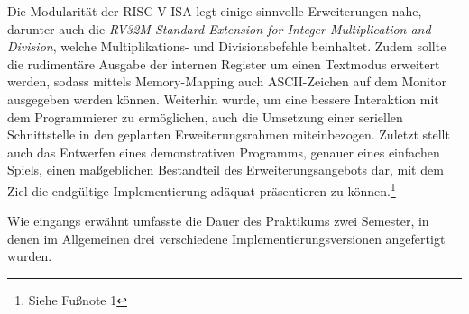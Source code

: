 Die Modularit\"at der RISC-V ISA legt einige sinnvolle Erweiterungen nahe,
darunter auch die
\textit{RV32M Standard Extension for Integer Multiplication and Division},
welche Multiplikations- und Divisionsbefehle beinhaltet. Zudem sollte die
rudiment\"are Ausgabe der internen Register um einen Textmodus erweitert
werden, sodass mittels Memory-Mapping auch ASCII-Zeichen auf dem Monitor
ausgegeben werden k\"onnen. Weiterhin wurde, um eine bessere Interaktion mit
dem Programmierer zu erm\"oglichen, auch die Umsetzung einer seriellen
Schnittstelle in den geplanten Erweiterungsrahmen miteinbezogen. Zuletzt
stellt auch das Entwerfen eines demonstrativen Programms, genauer eines
einfachen Spiels, einen ma\ss{}geblichen Bestandteil des Erweiterungsangebots
dar, mit dem Ziel die endg\"ultige Implementierung ad\"aquat pr\"asentieren zu k\"onnen.\footnote{Siehe Fu\ss{}note 1}

Wie eingangs erw\"ahnt umfasste die Dauer des Praktikums zwei Semester, in
denen im Allgemeinen drei verschiedene Implementierungsversionen angefertigt
wurden.

